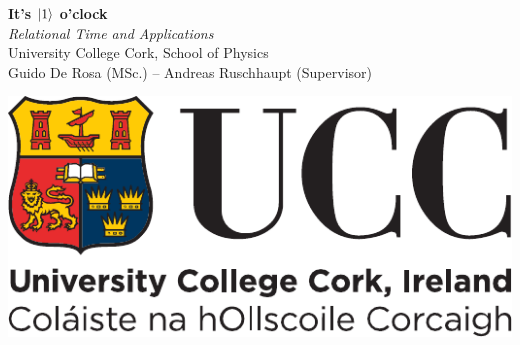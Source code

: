 \documentclass[a0,portrait]{a0poster}
\begin{document}

\begin{minipage}[c]{0.70\linewidth}
\VeryHuge\color{NavyBlue}\textbf{It's $\ket{1}$ o'clock} \color{Black}\\[0.5cm] %
\huge\textit{Relational Time and Applications}\\[1cm] %
\huge University College Cork, School of Physics\\[0.66cm] %
\Large{Guido De Rosa (MSc.) -- Andreas Ruschhaupt (Supervisor)}

\end{minipage}%
%
\begin{minipage}[t]{0.30\linewidth}
\includegraphics[width=18cm]{ucc_logo.pdf}\\  %
\end{minipage}

\vspace{2cm} %

\end{document}
